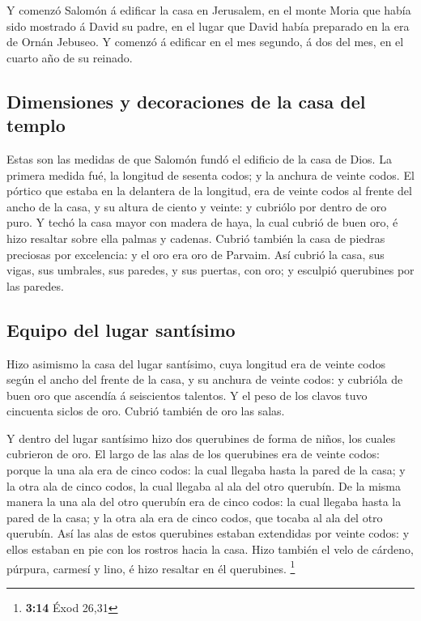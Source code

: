  Y comenzó Salomón á edificar la casa en Jerusalem, en el
monte Moria que había sido mostrado á David su padre, en el lugar que
David había preparado en la era de Ornán Jebuseo.  Y comenzó
á edificar en el mes segundo, á dos del mes, en el cuarto año de su
reinado.

\hypertarget{dimensiones-y-decoraciones-de-la-casa-del-templo}{%
\subsection{Dimensiones y decoraciones de la casa del
templo}\label{dimensiones-y-decoraciones-de-la-casa-del-templo}}

 Estas son las medidas de que Salomón fundó el edificio de
la casa de Dios. La primera medida fué, la longitud de sesenta codos; y
la anchura de veinte codos.  El pórtico que estaba en la
delantera de la longitud, era de veinte codos al frente del ancho de la
casa, y su altura de ciento y veinte: y cubriólo por dentro de oro puro.
 Y techó la casa mayor con madera de haya, la cual cubrió de
buen oro, é hizo resaltar sobre ella palmas y cadenas. 
Cubrió también la casa de piedras preciosas por excelencia: y el oro era
oro de Parvaim.  Así cubrió la casa, sus vigas, sus
umbrales, sus paredes, y sus puertas, con oro; y esculpió querubines por
las paredes.

\hypertarget{equipo-del-lugar-santuxedsimo}{%
\subsection{Equipo del lugar
santísimo}\label{equipo-del-lugar-santuxedsimo}}

 Hizo asimismo la casa del lugar santísimo, cuya longitud
era de veinte codos según el ancho del frente de la casa, y su anchura
de veinte codos: y cubrióla de buen oro que ascendía á seiscientos
talentos.  Y el peso de los clavos tuvo cincuenta siclos de
oro. Cubrió también de oro las salas.

 Y dentro del lugar santísimo hizo dos querubines de forma
de niños, los cuales cubrieron de oro.  El largo de las
alas de los querubines era de veinte codos: porque la una ala era de
cinco codos: la cual llegaba hasta la pared de la casa; y la otra ala de
cinco codos, la cual llegaba al ala del otro querubín.  De
la misma manera la una ala del otro querubín era de cinco codos: la cual
llegaba hasta la pared de la casa; y la otra ala era de cinco codos, que
tocaba al ala del otro querubín.  Así las alas de estos
querubines estaban extendidas por veinte codos: y ellos estaban en pie
con los rostros hacia la casa.  Hizo también el velo de
cárdeno, púrpura, carmesí y lino, é hizo resaltar en él querubines.
\footnote{\textbf{3:14} Éxod 26,31}

